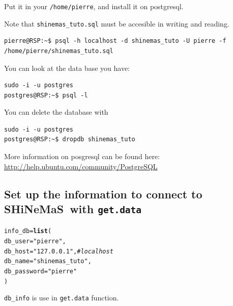 \documentclass{article}\usepackage[]{graphicx}\usepackage[]{color}
\makeatletter
\newcommand{\hlstr}[1]{\textcolor[rgb]{0.192,0.494,0.8}{#1}}%
\newcommand{\hlcom}[1]{\textcolor[rgb]{0.678,0.584,0.686}{\textit{#1}}}%
\newcommand{\hlstd}[1]{\textcolor[rgb]{0.345,0.345,0.345}{#1}}%
\newcommand{\hlkwb}[1]{\textcolor[rgb]{0.69,0.353,0.396}{#1}}%
\newcommand{\hlkwc}[1]{\textcolor[rgb]{0.333,0.667,0.333}{#1}}%
\newcommand{\hlkwd}[1]{\textcolor[rgb]{0.737,0.353,0.396}{\textbf{#1}}}%
\newenvironment{kframe}{%
 \def\at@end@of@kframe{}%
 \ifinner\ifhmode%
  \def\at@end@of@kframe{\end{minipage}}%
  \begin{minipage}{\columnwidth}%
 \fi\fi%
 \def\FrameCommand##1{\hskip\@totalleftmargin \hskip-\fboxsep
 \colorbox{shadecolor}{##1}\hskip-\fboxsep
     \hskip-\linewidth \hskip-\@totalleftmargin \hskip\columnwidth}%
 \MakeFramed {\advance\hsize-\width
   \@totalleftmargin\z@ \linewidth\hsize
   \@setminipage}}%
 {\par\unskip\endMakeFramed%
 \at@end@of@kframe}
\newenvironment{knitrout}{}{} %
\newcommand{\BD}{SHiNeMaS}
\makeatother
\begin{document}
\begin{appendices}
Put it in your \texttt{/home/pierre}, and install it on postgresql.

Note that \texttt{shinemas\_tuto.sql} must be accesible in writing and reading.

\begin{verbatim}
pierre@RSP:~$ psql -h localhost -d shinemas_tuto -U pierre -f /home/pierre/shinemas_tuto.sql
\end{verbatim}

You can look at the data base you have:
\begin{verbatim}
sudo -i -u postgres
postgres@RSP:~$ psql -l
\end{verbatim}

You can delete the database with
\begin{verbatim}
sudo -i -u postgres
postgres@RSP:~$ dropdb shinemas_tuto
\end{verbatim}

More information on posgresql can be found here: \url{http://help.ubuntu.com/community/PostgreSQL}

\subsection{Set up the information to connect to \BD~with \texttt{get.data}}

\begin{knitrout}
\color{fgcolor}\begin{kframe}
\begin{alltt}
\hlstd{info_db} \hlkwb{=} \hlkwd{list}\hlstd{(}
        \hlkwc{db_user} \hlstd{=} \hlstr{"pierre"}\hlstd{,}
        \hlkwc{db_host} \hlstd{=} \hlstr{"127.0.0.1"}\hlstd{,} \hlcom{# localhost}
        \hlkwc{db_name} \hlstd{=} \hlstr{"shinemas_tuto"}\hlstd{,}
        \hlkwc{db_password} \hlstd{=} \hlstr{"pierre"}
        \hlstd{)}
\end{alltt}
\end{kframe}
\end{knitrout}

\texttt{db\_info} is use in \texttt{get.data} function.






\newpage



\newpage



\newpage



\end{appendices}
\end{document}
